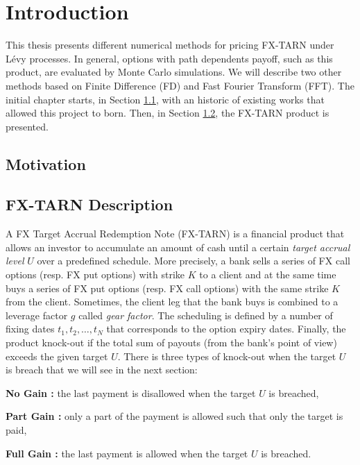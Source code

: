 \chapter{Introduction}
\label{sec:intro}


This thesis presents different numerical methods for pricing FX-TARN under L\'evy processes. In general, options with path dependents payoff, such as this product, are evaluated by Monte Carlo simulations. We will describe two other methods based on Finite Difference (FD) and Fast Fourier Transform (FFT). The initial chapter starts, in Section \ref{sec:intro:motivation}, with an historic of existing works that allowed this project to born. Then, in Section \ref{sec:intro:description}, the FX-TARN product is presented.  

\section{Motivation}
\label{sec:intro:motivation}

\section{FX-TARN Description}
\label{sec:intro:description}
A FX Target Accrual Redemption Note (FX-TARN) is a financial product that allows an investor to accumulate an amount of cash until a certain \textit{target accrual level} $U$ over a predefined schedule. More precisely, a bank sells a series of FX call options (resp. FX put options) with strike $K$ to a client and at the same time buys a series of FX put options (resp. FX call options) with the same strike $K$ from the client. Sometimes, the client leg that the bank buys is combined to a leverage factor $g$ called \textit{gear factor}. The scheduling is defined by a number of fixing dates $t_1,t_2,\ldots,t_N$ that corresponds to the option expiry dates. Finally, the product knock-out if the total sum of payouts (from the bank's point of view) exceeds the given target $U$. There is three types of knock-out when the target $U$ is breach that we will see in the next section:
\begin{my_list_item}
\item \textbf{No Gain :} the last payment is disallowed when the target $U$ is breached,
\item \textbf{Part Gain :} only a part of the payment is allowed such that only the target is paid,
\item \textbf{Full Gain :} the last payment is allowed when the target $U$ is breached. 
\end{my_list_item}


